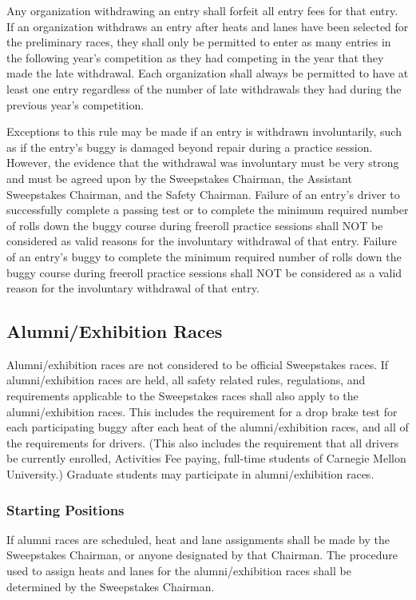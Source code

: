 Any organization withdrawing an entry shall forfeit all entry fees for that entry. If an organization withdraws an entry after heats and lanes have been selected for the preliminary races, they shall only be permitted to enter as many entries in the following year's competition as they had competing in the year that they made the late withdrawal. Each organization shall always be permitted to have at least one entry regardless of the number of late withdrawals they had during the previous year's competition.

Exceptions to this rule may be made if an entry is withdrawn involuntarily, such as if the entry's buggy is damaged beyond repair during a practice session. However, the evidence that the withdrawal was involuntary must be very strong and must be agreed upon by the Sweepstakes Chairman, the Assistant Sweepstakes Chairman, and the Safety Chairman. Failure of an entry's driver to successfully complete a passing test or to complete the minimum required number of rolls down the buggy course during freeroll practice sessions shall NOT be considered as valid reasons for the involuntary withdrawal of that entry. Failure of an entry's buggy to complete the minimum required number of rolls down the buggy course during freeroll practice sessions shall NOT be considered as a valid reason for the involuntary withdrawal of that entry.

\subsection{Alumni/Exhibition Races}

Alumni/exhibition races are not considered to be official Sweepstakes races. If alumni/exhibition races are held, all safety related rules, regulations, and requirements applicable to the Sweepstakes races shall also apply to the alumni/exhibition races. This includes the requirement for a drop brake test for each participating buggy after each heat of the alumni/exhibition races, and all of the requirements for drivers. (This also includes the requirement that all drivers be currently enrolled, Activities Fee paying, full-time students of Carnegie Mellon University.) Graduate students may participate in alumni/exhibition races.

\subsubsection{Starting Positions}

If alumni races are scheduled, heat and lane assignments shall be made by the Sweepstakes Chairman, or anyone designated by that Chairman. The procedure used to assign heats and lanes for the alumni/exhibition races shall be determined by the Sweepstakes Chairman.

